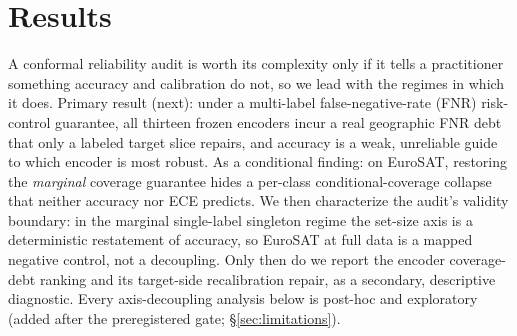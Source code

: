 \documentclass[journal]{IEEEtran}
\renewcommand{\_}{\textunderscore\allowbreak}
\begin{document}
\section{Results}\label{sec:results}
A conformal reliability audit is worth its complexity only if it tells a practitioner
something accuracy and calibration do not, so we lead with the regimes in which it does. Primary
result (next): under a multi-label false-negative-rate (FNR) risk-control guarantee, all thirteen frozen
encoders incur a real geographic FNR debt that only a labeled target slice repairs, and accuracy is a
weak, unreliable guide to which encoder is most robust. As a conditional finding: on EuroSAT,
restoring the \emph{marginal} coverage guarantee hides a per-class conditional-coverage collapse that
neither accuracy nor ECE predicts. We then characterize the audit's validity boundary: in the
marginal single-label singleton regime the set-size axis is a deterministic restatement of accuracy, so
EuroSAT at full data is a mapped negative control, not a decoupling. Only then do we report the encoder
coverage-debt ranking and its target-side recalibration repair, as a secondary, descriptive
diagnostic. Every axis-decoupling analysis below is post-hoc and exploratory (added after the
preregistered gate; \S\ref{sec:limitations}).
\end{document}
